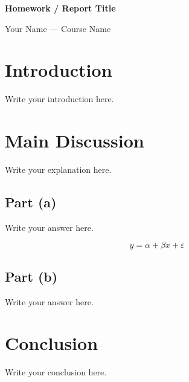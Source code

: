 \documentclass[11pt,letterpaper]{article}
\begin{document}
{\LARGE\bfseries Homework / Report Title\par}
\medskip

Your Name --- Course Name

\section{Introduction}
Write your introduction here.

\section{Main Discussion}
Write your explanation here.

\subsection*{Part (a)}
Write your answer here.

\begin{equation}
  y = \alpha + \beta x + \varepsilon
\end{equation}

\subsection*{Part (b)}
Write your answer here.

\section{Conclusion}
Write your conclusion here.
\end{document}

